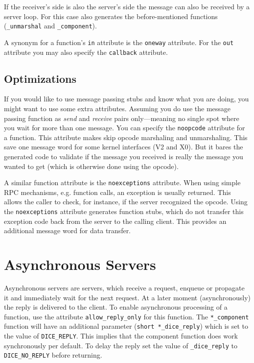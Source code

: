 If the receiver's side is also the server's side the message
can also be received by a server loop. For this case \dice{} also
generates the before-mentioned functions (\verb|_unmarshal| and
\verb|_component|).

A synonym for a function's \verb|in| attribute is the \verb|oneway|
attribute.  For the \verb|out| attribute you may also specify the
\verb|callback| attribute.

\subsection{Optimizations}
If you would like to use message passing stubs and know what you are
doing, you might want to use some extra attributes. Assuming you do
use the message passing function as \emph{send} and \emph{receive}
pairs only---meaning no single spot where you wait for more than one
message. You can specify the \verb|noopcode| attribute for a function.
This attribute makes \dice{} skip opcode marshaling and unmarshaling.
This save one message word for some kernel interfaces (V2 and X0).
But it bares the generated code to validate if the message you received
is really the message you wanted to get (which is otherwise done using
the opcode).

A similar function attribute is the \verb|noexceptions| attribute. When
using simple RPC mechanisms, e.g. function calls, an exception is
usually returned. This allows the caller to check, for instance, if the
server recognized the opcode. Using the \verb|noexceptions| attribute
generates function stubs, which do not transfer this exception code
back from the server to the calling client. This provides an additional
message word for data transfer.

\section{Asynchronous Servers}
\label{sec:asynchronous}
Asynchronous servers are servers, which receive a request, enqueue or
propagate it and immediately wait for the next request. At a later
moment (asynchronously) the reply is delivered to the client. To
enable asynchronous processing of a function, use the attribute
\verb|allow_reply_only| for this function. The \verb|*_component| function
will have an additional parameter (\verb|short *_dice_reply|) which is
set to the value of \verb|DICE_REPLY|. This implies that the component
function does work synchronously per default. To delay the reply
set the value of \verb|_dice_reply| to \verb|DICE_NO_REPLY| before
returning.

